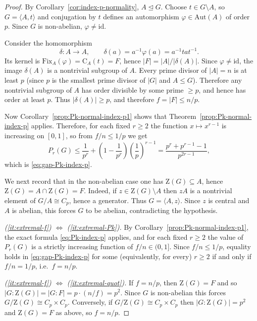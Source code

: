 \documentclass[11pt]{article}
\theoremstyle{definition}
\theoremstyle{remark}
\theoremstyle{definition}
\theoremstyle{plain}
\newcommand{\Z}{\mathrm{Z}}
\newcommand{\C}{\mathrm{C}}
\newcommand{\Aut}{\mathrm{Aut}}
\newcommand{\Fix}{\mathrm{Fix}}
\begin{document}
\begin{proof}
By Corollary~\ref{cor:index-p-normality}, $A\trianglelefteq G$.
Choose $t\in G\setminus A$, so $G=\langle A,t\rangle$ and conjugation by $t$ defines an automorphism
$\varphi\in \Aut(A)$ of order $p$.
Since $G$ is non-abelian, $\varphi\neq \mathrm{id}$.

Consider the homomorphism
\[
\delta:A\to A,\qquad \delta(a)=a^{-1}\varphi(a)=a^{-1}t a t^{-1}.
\]
Its kernel is $\Fix_A(\varphi)=\C_A(t)=F$, hence $|F|=|A|/|\delta(A)|$.
Since $\varphi\neq \mathrm{id}$, the image $\delta(A)$ is a nontrivial subgroup of $A$.
Every prime divisor of $|A|=n$ is at least $p$ (since $p$ is the smallest prime divisor of $|G|$ and $A\le G$).
Therefore any nontrivial subgroup of $A$ has order divisible by some prime $\ge p$, and hence has order at least $p$.
Thus $|\delta(A)|\ge p$, and therefore $f=|F|\le n/p$.

Now Corollary~\ref{prop:Pk-normal-index-p1} shows that Theorem~\ref{prop:Pk-normal-index-p} applies.
Therefore, for each fixed $r\ge 2$ the function $x\mapsto x^{r-1}$ is increasing on $[0,1]$, so from $f/n\le 1/p$ we get
\[
P_r(G)\le \frac{1}{p^r}+\left(1-\frac{1}{p^r}\right)\left(\frac{1}{p}\right)^{r-1}
=\frac{p^r+p^{r-1}-1}{p^{2r-1}},
\]
which is \eqref{eq:gap-Pk-index-p}.

We next record that in the non-abelian case one has $\Z(G)\subseteq A$, hence $\Z(G)=A\cap \Z(G)=F$.
Indeed, if $z\in \Z(G)\setminus A$ then $zA$ is a nontrivial element of $G/A\cong C_p$, hence a generator.
Thus $G=\langle A,z\rangle$.
Since $z$ is central and $A$ is abelian, this forces $G$ to be abelian, contradicting the hypothesis.

\smallskip
\noindent\emph{(\ref{it:extremal-f}) $\Longleftrightarrow$ (\ref{it:extremal-Pk}).}
By Corollary~\ref{prop:Pk-normal-index-p1}, the exact formula \eqref{eq:Pk-index-p} applies, and for each fixed $r\ge 2$ the value of $P_r(G)$ is a strictly increasing function of $f/n\in(0,1]$.
Since $f/n\le 1/p$, equality holds in \eqref{eq:gap-Pk-index-p} for some (equivalently, for every) $r\ge 2$
if and only if $f/n=1/p$, i.e.\ $f=n/p$.

\smallskip
\noindent\emph{(\ref{it:extremal-f}) $\Longleftrightarrow$ (\ref{it:extremal-quot}).}
If $f=n/p$, then $\Z(G)=F$ and so $|G:\Z(G)|=|G:F|=p\cdot(n/f)=p^2$.
Since $G$ is non-abelian this forces $G/\Z(G)\cong C_p\times C_p$.
Conversely, if $G/\Z(G)\cong C_p\times C_p$ then $|G:\Z(G)|=p^2$ and $\Z(G)=F$ as above, so $f=n/p$.


\end{proof}
\end{document}
